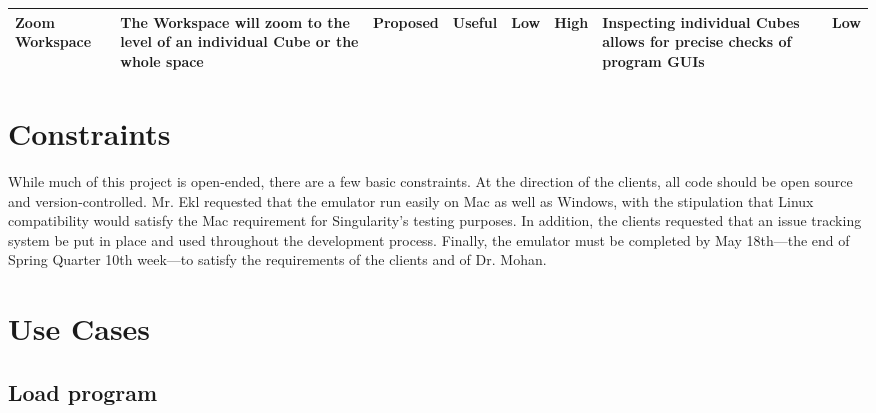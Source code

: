 \documentclass[12pt]{article}
\begin{document}
\begin{landscape}
\begin{table}[h]
\begin{tabular}{p{1.5in} | p{1.75in} | p{.75in} | p{.75in} | p{.75in} | p{.75in} | p{1.75in} | p{.6in}}
        Zoom Workspace &
        The Workspace will zoom to the level of an individual Cube or the whole space &
        Proposed &
        Useful &
        Low &
        High &
        Inspecting individual Cubes allows for precise checks of program \glspl{GUI}\index{GUI}\glsadd{GUIa} &
        Low \\ \hline

      \end{tabular}
    \end{table}
    \end{landscape}

\section{Constraints}
        While much of this project is open-ended, there are a few basic constraints. At the direction of the clients, all code should be \gls{open source} and version-controlled. Mr. Ekl requested that the emulator run easily on \gls{Mac} as well as \gls{Windows}, with the stipulation that \gls{Linux} compatibility would satisfy the \gls{Mac} requirement for Singularity's testing purposes. In addition, the clients requested that an \gls{issue tracking system} be put in place and used throughout the development process. Finally, the emulator must be completed by May 18th---the end of Spring Quarter 10th week---to satisfy the requirements of the clients and of Dr. Mohan.

\section{Use Cases}

  \subsection{Load program}
\end{document}
